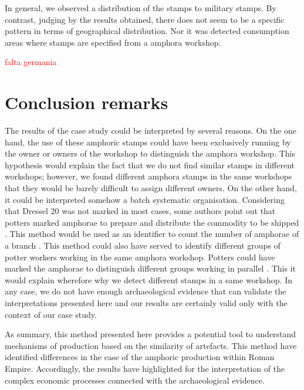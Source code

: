 \documentclass[review]{elsarticle}
\newcommand{\memo}[2]{\textcolor{#1}{#2}}
\newcommand{\maria}[1]{\memo{red}{#1\\}}
\begin{document}
In general, we observed a distribution of the stamps to military stamps. By contrast, judging by the results obtained, there does not seem to be a specific pattern in terms of geographical distribution. Nor it was detected consumption areas where stamps are specified from a amphora workshop. 





\maria{falta germania}









\section{Conclusion remarks}

The results of the case study could be interpreted by several reasons. On the one hand, the use of these amphoric stamps could have been exclusively running by the owner or owners of the workshop to distinguish the amphora workshop. This hypothesis would explain the fact that we do not find similar stamps in different workshops; however, we found different amphora stamps in the same workshops that they would be barely difficult to assign different owners. On the other hand, it could be interpreted somehow a batch systematic organisation. Considering that Dressel 20 was not marked in most cases, some authors point out that potters marked amphorae to prepare and distribute the commodity to be shipped \citep{berni_millet_epigrafianforica_2008}. This method would be used as an identifier to count the number of amphorae of a branch \citep{juanmorostesis}. This method could also have served to identify different groups of potter workers working in the same amphora workshop. Potters could have marked the amphorae to distinguish different groups working in parallel \citep{li_crossbows_2014}. This it would explain wherefore why we detect different stamps in a same workshop. 
In any case, we do not have enough archaeological evidence that can validate the interpretations presented here and our results are certainly valid only with the context of our case study. 

As summary, this method presented here provides a potential tool to understand mechanisms of production based on the similarity of artefacts. This method have identified differences in the case of the amphoric production within Roman Empire. Accordingly, the results have highlighted for the interpretation of the complex economic processes connected with the archaeological evidence. 
\end{document}
